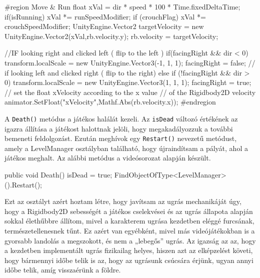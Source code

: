 \begin{java}
    #region Move & Run
    float xVal = dir * speed * 100 * Time.fixedDeltaTime;
    if(isRunning)
    {
        xVal *= runSpeedModifier;
    }
    if (crouchFlag)
    {
        xVal *= crouchSpeedModifier;
    }
    UnityEngine.Vector2 targetVelocity = 
        new UnityEngine.Vector2(xVal,rb.velocity.y);
    rb.velocity = targetVelocity;

    //IF looking right and clicked left ( flip to the left )
    if(facingRight && dir < 0)
    {
        transform.localScale = 
            new UnityEngine.Vector3(-1, 1, 1);
        facingRight = false;
    }
    // if looking left and clicked right ( flip to the right)
    else if (!facingRight && dir > 0) 
    {
        transform.localScale = 
            new UnityEngine.Vector3(1, 1, 1);
        facingRight = true;   
    }
    // set the float xVelocity according to the x value
    // of the Rigidbody2D velocity
    animator.SetFloat("xVelocity",Mathf.Abs(rb.velocity.x));
    #endregion
\end{java}

A \texttt{Death()} metódus a játékos halálát kezeli. Az \texttt{isDead} változó értékének az igazra állítása a játékost halottnak jelöli, hogy megakadályozzuk a további bemeneti feldolgozást. Ezután meghívok egy \texttt{Restart()} nevezetű metódust, amely a LevelManager osztályban található, hogy újraindítsam a pályát, ahol a játékos meghalt. Az alábbi metódus a \cite{youtubeplaylist} videósorozat alapján készült.

\begin{java}
public void Death()
{
    isDead = true;
    FindObjectOfType<LevelManager>().Restart();
}
\end{java}


Ezt az osztályt azért hoztam létre, hogy javítsam az ugrás mechanikáját úgy, hogy a Rigidbody2D sebességét a játékos cselekvései és az ugrás állapota alapján sokkal élethűbbre állítom, mivel a karakterem ugrása kezdetben eléggé furcsának, természetellenesnek tűnt. Ez azért van egyébként, mivel más videójátékokban is a gyorsabb landolás a megszokott, és nem a „lebegős” ugrás. Az igazság az az, hogy a kezdetben implementált ugrás fizikailag helyes, hiszen azt az elképzelést követi, hogy bármennyi időbe telik is az, hogy az ugrásunk csúcsára érjünk, ugyan annyi időbe telik, amíg visszaérünk a földre. \cite{betterjump}

